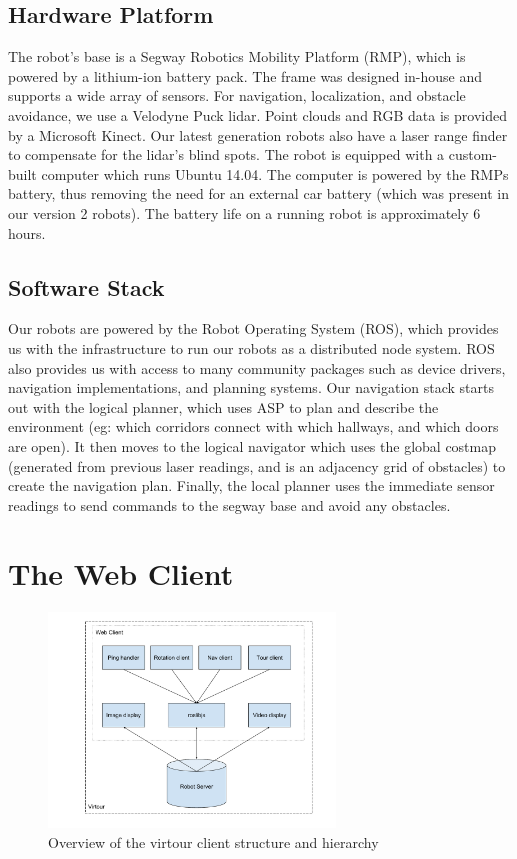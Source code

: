 \documentclass{sig-alternate-05-2015}
\begin{document}
\subsection{Hardware Platform}

The robot's base is a Segway Robotics Mobility Platform (RMP), which is
powered by a lithium-ion battery pack. The frame was designed in-house and
supports a wide array of sensors. For navigation, localization, and obstacle
avoidance, we use a Velodyne Puck lidar. Point clouds and RGB data is provided
by a Microsoft Kinect. Our latest generation robots also have a laser range
finder to compensate for the lidar's blind spots. The robot is equipped with a
custom-built computer which runs Ubuntu 14.04. The computer is powered by the
RMPs battery, thus removing the need for an external car battery (which was
present in our version 2 robots).  The battery life on a running robot is
approximately 6 hours.

\subsection{Software Stack}

Our robots are powered by the Robot Operating System (ROS), which provides us
with the infrastructure to run our robots as a distributed node system. ROS
also provides us with access to many community packages such as device drivers,
navigation implementations, and planning systems. Our navigation stack starts
out with the logical planner, which uses ASP to plan and describe the
environment (eg: which corridors connect with which hallways, and which doors
are open). It then moves to the logical navigator which uses the global costmap
(generated from previous laser readings, and is an adjacency grid of obstacles)
to create the navigation plan.  Finally, the local planner uses the immediate
sensor readings to send commands to the segway base and avoid any obstacles.

\section{The Web Client}

\begin{figure}
\centering
\includegraphics[width=3in]{virtour_client}
\caption{Overview of the virtour client structure and hierarchy}
\end{figure}
\end{document}
